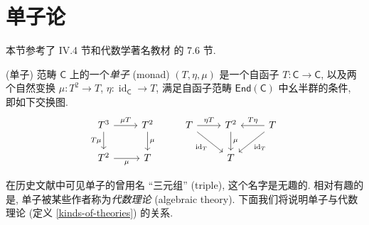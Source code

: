
\section{单子论}

本节参考了 \cite{SGL} IV.4 节和代数学著名教材 \cite{lww2} 的 7.6 节.

\begin{definition}
    [label={monad-definition}]
    {(单子)}
    范畴 $\mathsf C$ 上的一个\emph{单子} (monad) $(T,\eta,\mu)$ 是一个自函子 $T \colon \mathsf C \to \mathsf C$, 以及两个自然变换 $\mu\colon T^2 \to T$, $\eta \colon \operatorname{id}_{\mathsf C} \to T$, 满足自函子范畴 $\mathsf {End}(\mathsf C)$ 中幺半群的条件, 即如下交换图.
\[\begin{tikzcd}[ampersand replacement=\&]
	{T^3} \& {T^2} \& {T} \& {T^2} \& {T} \\
	{T^2} \& T \&\& T
	\arrow["{\mu T}", from=1-1, to=1-2]
	\arrow["T\mu"', from=1-1, to=2-1]
	\arrow["\mu"', from=2-1, to=2-2]
	\arrow["\mu", from=1-2, to=2-2]
	\arrow["\mu", from=1-4, to=2-4]
	\arrow["{\operatorname{id}_T}"', from=1-3, to=2-4]
	\arrow["{\operatorname{id}_T}", from=1-5, to=2-4]
	\arrow["{\eta T}", from=1-3, to=1-4]
	\arrow["T\eta"', from=1-5, to=1-4]
\end{tikzcd}\]
\end{definition}

\begin{remark}
	{}
	在历史文献中可见单子的曾用名 ``三元组'' (triple), 这个名字是无趣的.
	相对有趣的是, 单子被某些作者称为\emph{代数理论} (algebraic theory). 下面我们将说明单子与代数理论 (定义 \ref{kinds-of-theories}) 的关系.
\end{remark}

